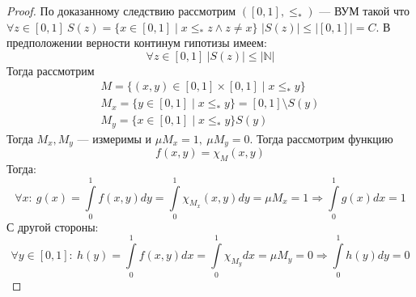 \begin{proof}
	По доказанному следствию рассмотрим $([0,1], \leq_*)$ --- ВУМ такой что $\forall z \in [0,1] \ S(z) = \{x \in [0,1] \mid x \leq_* z \wedge z \neq x\}$ $|S(z)| \leq |[0,1]| = C$. В предположении верности континум гипотизы имеем:
	$$
	\forall z \in [0,1] \ |S(z)| \leq |\mathbb{N}|
	$$
	Тогда рассмотрим 
	\begin{gather*}
		M = \{(x,y) \in [0,1] \times [0,1] \mid x \leq_* y \} \\
		M_x = \{y \in [0,1] \mid x \leq_* y \} = [0,1] \setminus S(y) \\
		M_y = \{x \in [0,1] \mid x \leq_* y \}S(y)
	\end{gather*}
	Тогда $M_x, M_y$ --- измеримы и $\mu M_x = 1, \ \mu M_y  =  0$. Тогда рассмотрим функцию $$f(x,y) = \chi_M(x,y)$$ Тогда:
	$$
	\forall x : \ g(x) = \int\limits_{0}^1 f(x,y)dy = \int\limits_{0}^1 \chi_{M_x}(x,y)dy = \mu M_x = 1 \Rightarrow \int\limits_{0}^1 g(x) dx = 1
	$$
	С другой стороны: 
	$$
	\forall y \in [0,1]: \ h(y) = \int\limits_{0}^1 f(x,y)dx = \int\limits_{0}^1 \chi_{M_y} dx = \mu M_y = 0 \Rightarrow \int\limits_{0}^1h(y)dy = 0
	$$
\end{proof}